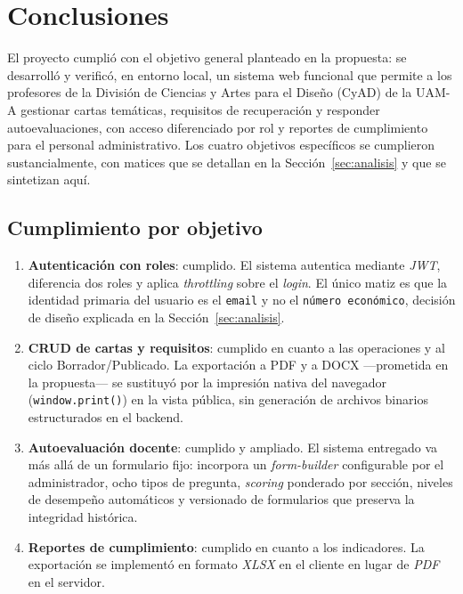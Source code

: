 \section{Conclusiones}\label{sec:conclusiones}
\justifying

El proyecto cumplió con el objetivo general planteado en la propuesta: se desarrolló y verificó, en entorno local, un sistema web funcional que permite a los profesores de la División de Ciencias y Artes para el Diseño (CyAD) de la UAM-A gestionar cartas temáticas, requisitos de recuperación y responder autoevaluaciones, con acceso diferenciado por rol y reportes de cumplimiento para el personal administrativo. Los cuatro objetivos específicos se cumplieron sustancialmente, con matices que se detallan en la Sección~\ref{sec:analisis} y que se sintetizan aquí.

\subsection{Cumplimiento por objetivo}

\begin{enumerate}
    \item \textbf{Autenticación con roles}: cumplido. El sistema autentica mediante \emph{JWT}, diferencia dos roles y aplica \emph{throttling} sobre el \emph{login}. El único matiz es que la identidad primaria del usuario es el \texttt{email} y no el \texttt{número económico}, decisión de diseño explicada en la Sección~\ref{sec:analisis}.
    \item \textbf{CRUD de cartas y requisitos}: cumplido en cuanto a las operaciones y al ciclo Borrador/Publicado. La exportación a PDF y a DOCX ---prometida en la propuesta--- se sustituyó por la impresión nativa del navegador (\texttt{window.print()}) en la vista pública, sin generación de archivos binarios estructurados en el backend.
    \item \textbf{Autoevaluación docente}: cumplido y ampliado. El sistema entregado va más allá de un formulario fijo: incorpora un \emph{form-builder} configurable por el administrador, ocho tipos de pregunta, \emph{scoring} ponderado por sección, niveles de desempeño automáticos y versionado de formularios que preserva la integridad histórica.
    \item \textbf{Reportes de cumplimiento}: cumplido en cuanto a los indicadores. La exportación se implementó en formato \emph{XLSX} en el cliente en lugar de \emph{PDF} en el servidor.
\end{enumerate}

